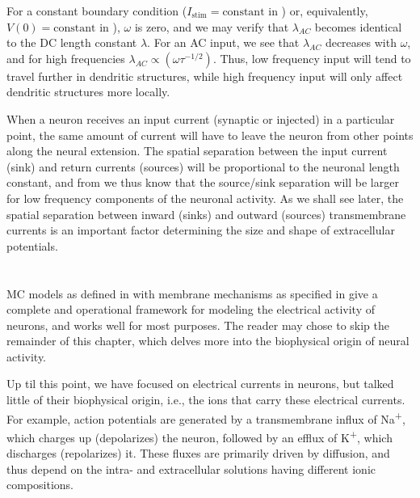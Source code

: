 For a constant boundary condition ($I_\text{stim} = \text{constant}$ in ) or, equivalently, $V(0) = \text{constant}$ in ), $\omega$ is zero, and we may verify that $\lambda_{AC}$ becomes identical to the DC length constant $\lambda$. For an AC input, we see that $\lambda_{AC}$ decreases with $\omega$, and for high frequencies $\lambda_{AC} \propto (\omega \tau^{-1/2})$. Thus, low frequency input will tend to travel further in dendritic structures, while high frequency input will only affect dendritic structures more locally. 

When a neuron receives an input current (synaptic or injected) in a particular point, the same amount of current will have to leave the neuron from other points along the neural extension. The spatial separation between the input current (sink) and return currents (sources) will be proportional to the neuronal length constant, and from  we thus know that the source/sink separation will be larger for low frequency components of the neuronal activity. As we shall see later, the spatial separation between inward (sinks) and outward (sources) transmembrane currents is an important factor determining the size and shape of extracellular potentials. 





\section{}
\label{sec:Neuron:Ions_and_reversals}
MC models as defined in  with membrane mechanisms as specified in  give a complete and operational framework for modeling the electrical activity of neurons, and works well for most purposes. The reader may chose to skip the remainder of this chapter, which delves more into the biophysical origin of neural activity. 

Up til this point, we have focused on electrical currents in neurons, but talked little of their biophysical origin, i.e., the ions that carry these electrical currents. For example, action potentials are generated by a transmembrane influx of Na\textsuperscript{+}, 
which charges up 
(depolarizes) the neuron, followed by an efflux of K\textsuperscript{+}, which discharges (repolarizes) it. These fluxes are primarily driven by diffusion, and thus depend on the intra- and extracellular solutions having different ionic compositions. 

